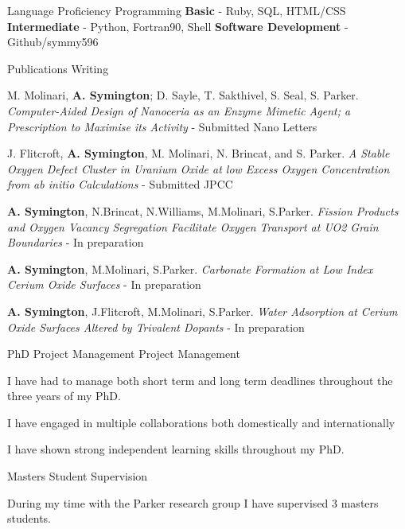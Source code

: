 \begin{cventries}
    \cventry    
	{Language Proficiency}
	{Programming}
	{}
	{}
    {
		\textbf{Basic} - Ruby, SQL, HTML/CSS \newline
		\textbf{Intermediate} - Python, Fortran90, Shell \newline
		\textbf{Software Development} - Github/symmy596
    }
    


\cventry
	{Publications}    
	{Writing}
	{}
	{}
    {
    \begin{cvitems}
		\item{M. Molinari, \textbf{A. Symington}; D. Sayle, T. Sakthivel, S. Seal, S. Parker. \textit{Computer-Aided Design of Nanoceria as an Enzyme Mimetic Agent; a Prescription to Maximise its Activity} - Submitted Nano Letters}
		\item{J. Flitcroft, \textbf{A. Symington}, M. Molinari, N. Brincat, and S. Parker. \textit{A Stable Oxygen Defect Cluster in Uranium Oxide at low Excess Oxygen Concentration from ab initio Calculations} - Submitted JPCC}
		\item{\textbf{A. Symington}, N.Brincat, N.Williams, M.Molinari, S.Parker. \textit{Fission Products and Oxygen Vacancy Segregation Facilitate Oxygen Transport at UO2 Grain Boundaries} - In preparation}
		\item{\textbf{A. Symington}, M.Molinari, S.Parker. \textit{Carbonate Formation at Low Index Cerium Oxide Surfaces} - In preparation}
		\item{\textbf{A. Symington}, J.Flitcroft, M.Molinari, S.Parker. \textit{Water Adsorption at Cerium Oxide Surfaces Altered by Trivalent Dopants} - In preparation}
      \end{cvitems}
    }

\begin{cventries}
    \cventry
	{PhD Project Management}
	{Project Management}
	{}
	{}    
    {
      \begin{cvitems}
		\item{I have had to manage both short term and long term deadlines throughout the three years of my PhD.}
		\item{I have engaged in multiple collaborations both domestically and internationally}
		\item{I have shown strong independent learning skills throughout my PhD.}
      \end{cvitems}
    }
\end{cventries}

\cventry
	{Masters Student Supervision}
	{}
	{}
	{}    
    {
      \begin{cvitems}
		\item{During my time with the Parker research group I have supervised 3 masters students.}
      \end{cvitems}
    }
\end{cventries}